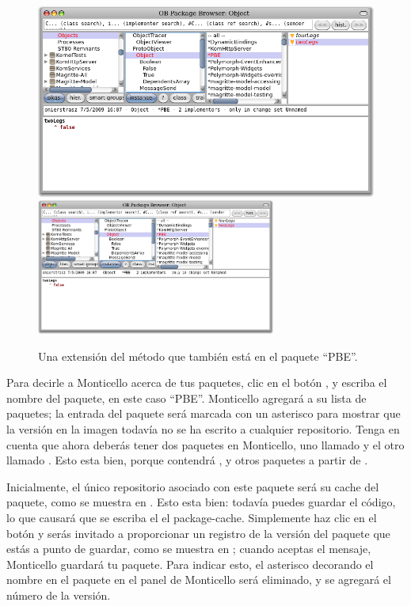 \documentclass[spanish,a4paper,10pt,twoside]{book}
\begin{document}
\begin{figure}[btp]
	\begin{center}
	\ifluluelse
		{\includegraphics[width=\textwidth]{MCnewmethod}}
		{\includegraphics[width=0.7\textwidth]{MCnewmethod}}
	\end{center}
	\caption{Una extensi\'on del m\'etodo que tambi\'en est\'a en el paquete ``PBE''.}
\end{figure}

Para decirle a Monticello acerca de tus paquetes, clic en el bot\'on , y escriba el nombre del paquete, en este caso ``PBE''.  Monticello agregar\'a  a su lista de paquetes; la entrada del paquete ser\'a marcada con un asterisco para mostrar que la versi\'on en la imagen todav\'ia no se ha escrito a cualquier repositorio. Tenga en cuenta que ahora deber\'as tener dos paquetes en Monticello, uno llamado  y el otro llamado . Esto esta bien, porque  contendr\'a , y otros paquetes a partir de .

Inicialmente, el \'unico repositorio asociado con este paquete ser\'a su cache
del paquete, como se muestra en .  Esto esta bien: todav\'ia
puedes guardar el c\'odigo, lo que causar\'a que se escriba el el package-cache.
Simplemente haz clic en el bot\'on  y ser\'as invitado a proporcionar un registro de la versi\'on del paquete que est\'as a punto de guardar, como se muestra en ; cuando aceptas el mensaje, Monticello guardar\'a tu paquete. Para indicar esto, el asterisco decorando el nombre en el paquete en el panel de Monticello ser\'a eliminado, y se agregar\'a el n\'umero de la versi\'on.
\end{document}
